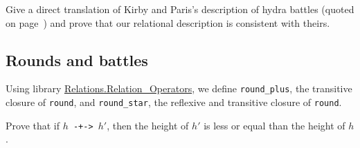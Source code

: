 \label{sect:infix-round}




\begin{project}
Give a direct translation of Kirby and Paris's description of hydra battles (quoted on page~\pageref{original-rules}) and prove that our relational description is consistent with theirs.
\end{project}


\subsection{Rounds and battles}


Using library \href{https://coq.inria.fr/distrib/current/stdlib/Coq.Relations.Relation_Operators.html}{Relations.Relation\_Operators}, we define \texttt{round\_plus},  the transitive closure of \texttt{round}, and \texttt{round\_star},  the reflexive and transitive closure of \texttt{round}.

\label{sect:infix-rounds} 




\begin{exercise}
  Prove that if \texttt{$h$ -+-> $h'$}, then
  the height of $h'$ is less or equal than the height of $h$.

\end{exercise}

